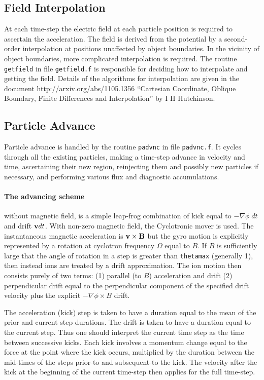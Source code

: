 \documentclass[12pt]{article}
\begin{document}
\subsection{Field Interpolation}

At each time-step the electric field at each particle position is
required to ascertain the acceleration. The field is derived from the
potential by a second-order interpolation at positions unaffected by
object boundaries. In the vicinity of object boundaries, more
complicated interpolation is required. The routine \verb!getfield! in
file \verb!getfield.f! is responsible for deciding how to interpolate
and getting the field. Details of the algorithms for interpolation are
given in the document http://arxiv.org/abs/1105.1356 ``Cartesian
Coordinate, Oblique Boundary, Finite Differences and Interpolation''
by I H Hutchinson.

\subsection{Particle Advance}

Particle advance is handled by the routine \verb!padvnc! in file
\verb!padvnc.f!. It cycles through all the existing particles, making
a time-step advance in velocity and time, ascertaining their new
region, reinjecting them and possibly new particles if necessary, and
performing various flux and diagnostic accumulations.

\paragraph{The advancing scheme} without magnetic field, is a simple
leap-frog combination of kick equal to $-\nabla\phi\;dt$ and drift
${\bf v} dt$. With non-zero magnetic field, the Cyclotronic mover is
used. The instantaneous magnetic acceleration is ${\bf v}\times{\bf
  B}$ but the gyro motion is explicitly represented by a rotation at
cyclotron frequency $\Omega$ equal to $B$. If $B$ is sufficiently
large that the angle of rotation in a step is greater than
\verb!thetamax! (generally 1), then instead ions are treated by a
drift approximation. The ion motion then consists purely of two
terms: (1) parallel (to $B$) acceleration and drift (2) perpendicular
drift equal to the perpendicular component of the specified drift
velocity plus the explicit $-\nabla\phi\times B$ drift.

The
acceleration (kick) step is taken to have a duration equal to the mean
of the prior and current step durations. The drift is taken to have a
duration equal to the current step. Thus one should interpret the
current time step as the time between successive kicks. Each kick
involves a momentum change equal to the force at the point where the
kick occurs, multiplied by the duration between the mid-times of the
steps prior-to and subsequent-to the kick. The velocity after the kick
at the beginning of the current time-step then applies for the full
time-step. 
\end{document}
